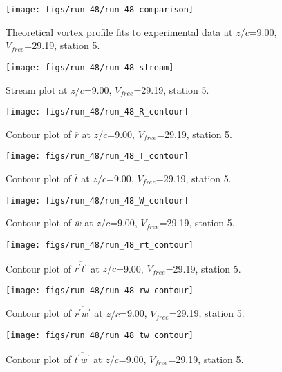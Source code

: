 \begin{figure}[H]
\centering
\texttt{[image: figs/run\_48/run\_48\_comparison]}
\caption{Theoretical vortex profile fits to experimental data at $z/c$=9.00, $V_{free}$=29.19, station 5.}
\label{fig:run_48_comparison}
\end{figure}


\begin{figure}[H]
\centering
\texttt{[image: figs/run\_48/run\_48\_stream]}
\caption{Stream plot at $z/c$=9.00, $V_{free}$=29.19, station 5.}
\label{fig:run_48_stream}
\end{figure}


\begin{figure}[H]
\centering
\texttt{[image: figs/run\_48/run\_48\_R\_contour]}
\caption{Contour plot of $\overline{r}$ at $z/c$=9.00, $V_{free}$=29.19, station 5.}
\label{fig:run_48_R_contour}
\end{figure}


\begin{figure}[H]
\centering
\texttt{[image: figs/run\_48/run\_48\_T\_contour]}
\caption{Contour plot of $\overline{t}$ at $z/c$=9.00, $V_{free}$=29.19, station 5.}
\label{fig:run_48_T_contour}
\end{figure}


\begin{figure}[H]
\centering
\texttt{[image: figs/run\_48/run\_48\_W\_contour]}
\caption{Contour plot of $\overline{w}$ at $z/c$=9.00, $V_{free}$=29.19, station 5.}
\label{fig:run_48_W_contour}
\end{figure}


\begin{figure}[H]
\centering
\texttt{[image: figs/run\_48/run\_48\_rt\_contour]}
\caption{Contour plot of $\overline{r^\prime t^\prime}$ at $z/c$=9.00, $V_{free}$=29.19, station 5.}
\label{fig:run_48_rt_contour}
\end{figure}


\begin{figure}[H]
\centering
\texttt{[image: figs/run\_48/run\_48\_rw\_contour]}
\caption{Contour plot of $\overline{r^\prime w^\prime}$ at $z/c$=9.00, $V_{free}$=29.19, station 5.}
\label{fig:run_48_rw_contour}
\end{figure}


\begin{figure}[H]
\centering
\texttt{[image: figs/run\_48/run\_48\_tw\_contour]}
\caption{Contour plot of $\overline{t^\prime w^\prime}$ at $z/c$=9.00, $V_{free}$=29.19, station 5.}
\label{fig:run_48_tw_contour}
\end{figure}


